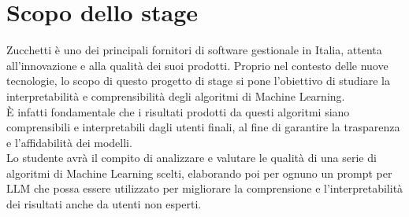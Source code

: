 \section{Scopo dello stage}
Zucchetti è uno dei principali fornitori di software gestionale in Italia, attenta all'innovazione e alla qualità dei suoi prodotti. 
Proprio nel contesto delle nuove tecnologie, lo scopo di questo progetto di stage si pone l'obiettivo di studiare la interpretabilità e comprensibilità degli algoritmi di Machine Learning.\\
È infatti fondamentale che i risultati prodotti da questi algoritmi siano comprensibili e interpretabili dagli utenti finali, al fine di garantire la trasparenza e l'affidabilità dei modelli.\\
Lo studente avrà il compito di analizzare e valutare le qualità di una serie di algoritmi di Machine Learning scelti, elaborando poi per ognuno un prompt per LLM che possa essere utilizzato per migliorare la comprensione e l'interpretabilità dei risultati anche da utenti non esperti.

